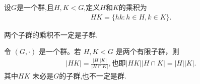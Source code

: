 \documentclass[../../main.tex]{subfiles}
\begin{document}
\begin{definition}[两个子群的乘积]
设$G$是一个群,且\(H, K < G\),定义$H$和$K$的乘积为
\begin{align*}
HK = \{hk : h \in H, k \in K\}.
\end{align*} 
\end{definition}
\begin{remark}
两个子群的乘积不一定是子群.
\end{remark}

\begin{proposition}
令 \((G, \cdot)\) 是一个群。若 \(H, K < G\) 是两个有限子群，则
\begin{align*}
|HK| = \frac{|H||K|}{|H \cap K|},\text{也即}|HK| |H \cap K|=|H| |K|.
\end{align*}
其中\(HK\) 未必是$G$的子群,也不一定是群.
\end{proposition}
\end{document}
